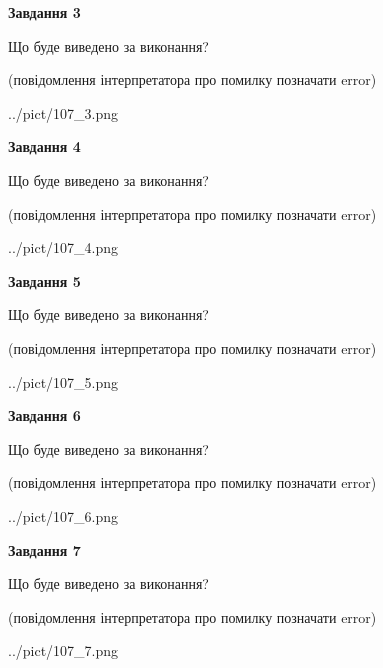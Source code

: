 \documentclass[12pt, ukrainian]{article}
\begin{document}
{\begin {large}
{\begin {center}\textbf{Завдання 3}\end {center}}\par
Що буде виведено за виконання?\par
 (повідомлення інтерпретатора про помилку позначати error)\par
\begin{center}
	{../pict/107_3.png}
\end{center}
\newpage

{\begin {center}\textbf{Завдання 4}\end {center}}\par
Що буде виведено за виконання?\par
 (повідомлення інтерпретатора про помилку позначати error)\par
\begin{center}
	{../pict/107_4.png}
\end{center}
\newpage

{\begin {center}\textbf{Завдання 5}\end {center}}\par
Що буде виведено за виконання?\par
 (повідомлення інтерпретатора про помилку позначати error)\par
\begin{center}
	{../pict/107_5.png}
\end{center}
\newpage

{\begin {center}\textbf{Завдання 6}\end {center}}\par
Що буде виведено за виконання?\par
 (повідомлення інтерпретатора про помилку позначати error)\par
\begin{center}
	{../pict/107_6.png}
\end{center}
\newpage

{\begin {center}\textbf{Завдання 7}\end {center}}\par
Що буде виведено за виконання?\par
 (повідомлення інтерпретатора про помилку позначати error)\par
\begin{center}
	{../pict/107_7.png}
\end{center}
\newpage


\end{large}}
\end{document}
